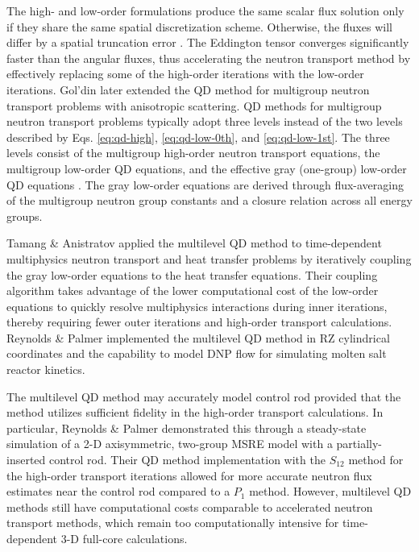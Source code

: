 The high- and low-order formulations produce the same scalar flux solution only if they share the
same spatial discretization scheme. Otherwise, the fluxes will differ by a spatial truncation
error \cite{adams_fast_2002}. The Eddington tensor converges significantly faster than the angular
fluxes, thus accelerating the neutron transport method by effectively replacing some of the
high-order iterations with the low-order iterations. Gol'din \cite{anistratov_solution_1986} later
extended the \gls{QD} method for multigroup neutron transport problems with anisotropic scattering.
\gls{QD} methods for multigroup neutron transport problems typically adopt three levels instead of
the two levels described by Eqs. \ref{eq:qd-high}, \ref{eq:qd-low-0th}, and \ref{eq:qd-low-1st}.
The three levels consist of the multigroup high-order neutron transport equations, the multigroup
low-order \gls{QD} equations, and the effective gray (one-group) low-order \gls{QD} equations
\cite{anistratov_solution_1986}. The gray low-order equations are derived through flux-averaging of
the multigroup neutron group constants and a closure relation across all energy groups.

Tamang \& Anistratov \cite{tamang_multilevel_2014} applied the multilevel \gls{QD} method to
time-dependent multiphysics neutron transport and heat transfer problems by iteratively coupling
the gray low-order equations to the heat transfer equations. Their coupling algorithm takes
advantage of the lower computational cost of the low-order equations to quickly resolve
multiphysics interactions during inner iterations, thereby requiring fewer outer iterations and
high-order transport calculations. Reynolds \& Palmer \cite{reynolds_analysis_2023} implemented the
multilevel \gls{QD} method in RZ cylindrical coordinates and the capability to model \gls{DNP} flow
for simulating molten salt reactor kinetics.

The multilevel \gls{QD} method may accurately model control rod provided that the method utilizes
sufficient fidelity in the high-order transport calculations. In particular, Reynolds \& Palmer
demonstrated this through a steady-state simulation of a 2-D axisymmetric, two-group \gls{MSRE}
model with a partially-inserted control rod. Their \gls{QD} method implementation with the $S_{12}$
method for the high-order transport iterations allowed for more accurate neutron flux estimates
near the control rod compared to a $P_1$ method. However, multilevel \gls{QD} methods still have
computational costs comparable to accelerated neutron transport methods, which remain too
computationally intensive for time-dependent 3-D full-core calculations.

